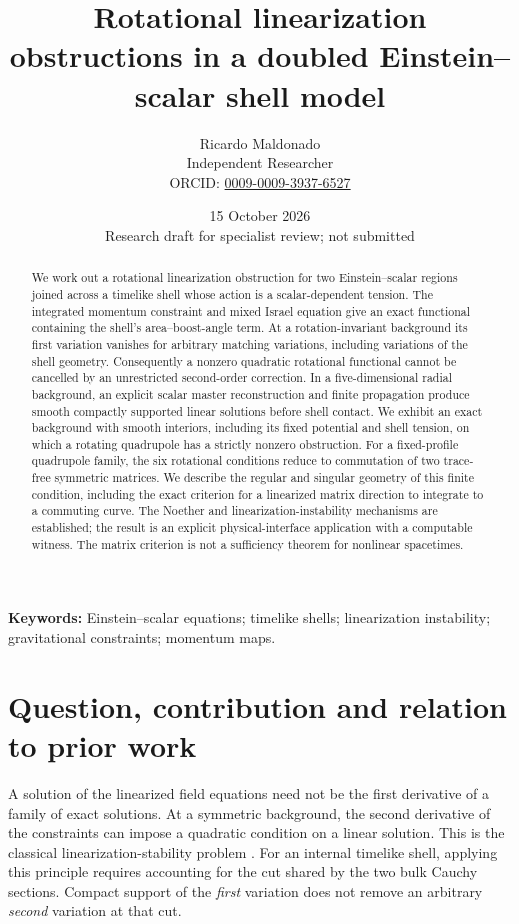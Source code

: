 \documentclass[11pt]{article}
\title{Rotational linearization obstructions in a doubled Einstein--scalar shell model}
\author{Ricardo Maldonado\\\small Independent Researcher\\
\small ORCID: \href{https://orcid.org/0009-0009-3937-6527}{0009-0009-3937-6527}}
\date{15 October 2026\\\small Research draft for specialist review; not submitted}
\theoremstyle{remark}
\begin{document}
\maketitle
\begin{abstract}
We work out a rotational linearization obstruction for two Einstein--scalar
regions joined across a timelike shell whose action is a scalar-dependent
tension. The integrated momentum constraint and mixed Israel equation give
an exact functional containing the shell's area--boost-angle term. At a
rotation-invariant background its first variation vanishes for arbitrary
matching variations, including variations of the shell geometry. Consequently
a nonzero quadratic rotational functional cannot be cancelled by an
unrestricted second-order correction. In a five-dimensional radial background,
an explicit scalar master reconstruction and finite propagation produce
smooth compactly supported linear solutions before shell contact. We exhibit
an exact background with smooth interiors, including its fixed potential and shell tension,
on which a rotating quadrupole has a strictly nonzero obstruction.
For a fixed-profile quadrupole family, the six rotational conditions reduce
to commutation of two trace-free symmetric matrices. We describe the regular
and singular geometry of this finite condition, including the exact criterion
for a linearized matrix direction to integrate to a commuting curve. The
Noether and linearization-instability mechanisms are established; the result
is an explicit physical-interface application with a computable witness.
The matrix criterion is not a sufficiency theorem for nonlinear spacetimes.
\end{abstract}
\noindent\textbf{Keywords:} Einstein--scalar equations; timelike shells;
linearization instability; gravitational constraints; momentum maps.

\section{Question, contribution and relation to prior work}

A solution of the linearized field equations need not be the first derivative
of a family of exact solutions. At a symmetric background, the second
derivative of the constraints can impose a quadratic condition on a linear
solution. This is the classical linearization-stability problem
\cite{FischerMarsden1973,Moncrief1975,ArmsMarsdenMoncrief1981}.
For an internal timelike shell, applying this principle requires accounting
for the cut shared by the two bulk Cauchy sections. Compact support of the
\emph{first} variation does not remove an arbitrary \emph{second} variation
at that cut.
\end{document}
